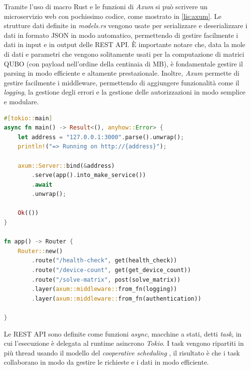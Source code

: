 
Tramite l'uso di macro Rust e le funzioni di \textit{Axum} si può scrivere un microservizio web con pochissimo codice, come mostrato in \ref{lis:axum}. Le strutture dati definite in \textit{models.rs} vengono usate per serializzare e deserializzare i dati in formato \gls{JSON} in modo automatico, permettendo di gestire facilmente i dati in input e in output delle REST \gls{API}. È importante notare che, data la mole di dati e parametri che vengono solitamente usati per la computazione di matrici \gls{QUBO} (con payload nell'ordine della centinaia di MB), è fondamentale gestire il parsing in modo efficiente e altamente prestazionale.
Inoltre, \textit{Axum} permette di gestire facilmente i middleware, permettendo di aggiungere funzionalità come il \textit{logging}, la gestione degli errori e la gestione delle autorizzazioni in modo semplice e modulare.

\vspace{5mm}
\begin{lstlisting}[language=Rust, caption=Inizializzazione Axum, label=lis:axum]
#[tokio::main]
async fn main() -> Result<(), anyhow::Error> {
    let address = "127.0.0.1:3000".parse().unwrap();
    println!("=> Running on http://{address}");

    axum::Server::bind(&address)
        .serve(app().into_make_service())
        .await
        .unwrap();

    Ok(())
}

fn app() -> Router {
    Router::new()
        .route("/health-check", get(health_check))
        .route("/device-count", get(get_device_count))
        .route("/solve-matrix", post(solve_matrix))
        .layer(axum::middleware::from_fn(logging))
        .layer(axum::middleware::from_fn(authentication))

}
\end{lstlisting}
\vspace{5mm}

\newpage

Le REST \gls{API} sono definite come funzioni \textit{async}, macchine a stati, detti \textit{task}, in cui l'esecuzione è delegata al runtime asincrono \textit{Tokio}. I task vengono ripartiti in più thread usando il modello del \textit{cooperative scheduling} \cite[]{Rust:Tokio_sched}, il risultato è che i task collaborano in modo da gestire le richieste e i dati in modo efficiente.

